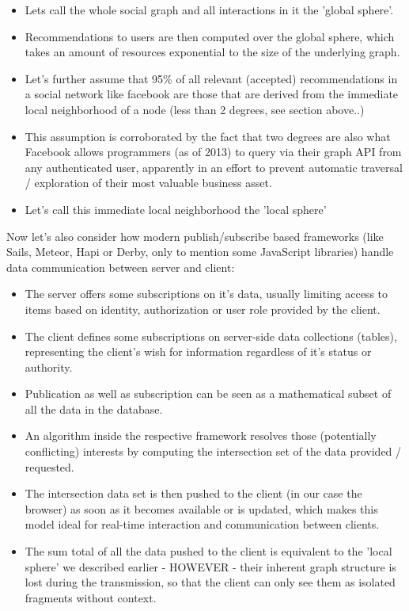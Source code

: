 	\begin{itemize}
		\item Lets call the whole social graph and all interactions in it the 'global sphere'.
		\item Recommendations to users are then computed over the global sphere, which takes an amount of resources exponential to the size of the underlying graph.
		\item Let's further assume that 95\% of all relevant (accepted) recommendations in a social network like facebook are those that are derived from the immediate local neighborhood of a node (less than 2 degrees, see section above..)
		\item This assumption is corroborated by the fact that two degrees are also what Facebook allows programmers (as of 2013) to query via their graph API from any authenticated user, apparently in an effort to prevent automatic traversal / exploration of their most valuable business asset.
		\item Let's call this immediate local neighborhood the 'local sphere'
	\end{itemize}
		
	Now let's also consider how modern publish/subscribe based frameworks (like Sails, Meteor, Hapi or Derby, only to mention some JavaScript libraries) handle data communication between server and client:
	
	\begin{itemize}
		\item The server offers some subscriptions on it's data, usually limiting access to items based on identity, authorization or user role provided by the client.
		\item The client defines some subscriptions on server-side data collections (tables), representing the client's wish for information regardless of it's status or authority.
		\item Publication as well as subscription can be seen as a mathematical subset of all the data in the database.
		\item An algorithm inside the respective framework resolves those (potentially conflicting) interests by computing the intersection set of the data provided / requested.
		\item The intersection data set is then pushed to the client (in our case the browser) as soon as it becomes available or is updated, which makes this model ideal for real-time interaction and communication between clients.
		\item The sum total of all the data pushed to the client is equivalent to the 'local sphere' we described earlier - HOWEVER - their inherent graph structure is lost during the transmission, so that the client can only see them as isolated fragments without context.
	\end{itemize}
	
